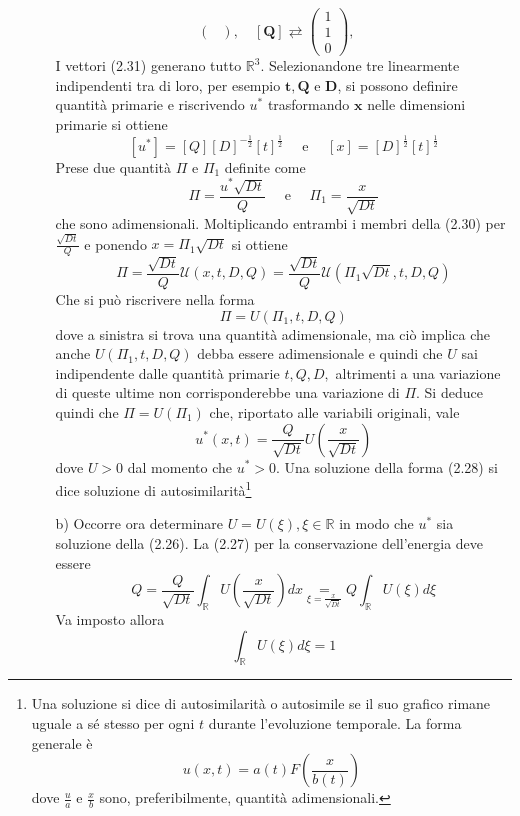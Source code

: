 \documentclass[a4paper,12pt, draft]{article}
\theoremstyle{break}
\numberwithin{equation}{section}
\begin{document}
\begin{itemize}
\begin{itemize}
\begin{equation}
\begin{pmatrix}
\end{pmatrix}, \quad
[\mathbf{Q}] \rightleftarrows \begin{pmatrix}
1\\ 1 \\ 0
\end{pmatrix}, \quad
\end{equation}
I vettori (2.31) generano tutto $\mathbb{R}^3$. Selezionandone tre linearmente indipendenti tra di loro, per esempio $\mathbf{t}, \mathbf{Q} \mbox{ e } \mathbf{D}$, si possono definire quantità primarie e riscrivendo $u^*$ trasformando $\bm{x}$ nelle dimensioni primarie si ottiene
$$
[u^*] = [Q][D]^{-\frac{1}{2}}[t]^{\frac{1}{2}} \quad \mbox{ e }\quad [x] = [D]^{\frac{1}{2}}[t]^{\frac{1}{2}} 
$$
Prese due quantità $\Pi$ e $\Pi_1$ definite come
$$
\Pi = \frac{u^*\sqrt{Dt}}{Q} \quad \mbox{ e } \quad \Pi_1 = \frac{x}{\sqrt{Dt}}
$$
che sono adimensionali. Moltiplicando entrambi i membri della (2.30) per $\frac{\sqrt{Dt}}{Q}$ e ponendo $x = \Pi_1\sqrt{Dt}$ si ottiene
$$
\Pi = \frac{\sqrt{Dt}}{Q}\mathcal{U}(x, t, D, Q) = \frac{\sqrt{Dt}}{Q}\mathcal{U}(\Pi_1\sqrt{Dt}, t, D, Q)
$$
Che si può riscrivere nella forma
\begin{equation}
\Pi = U(\Pi_1, t, D, Q)
\end{equation}
dove a sinistra si trova una quantità adimensionale, ma ciò implica che anche $U(\Pi_1, t, D, Q)$ debba essere adimensionale e quindi che $U$ sai indipendente dalle quantità primarie $t, Q, D,$ altrimenti a una variazione di queste ultime non corrisponderebbe una variazione di $\Pi$. Si deduce quindi che $\Pi = U(\Pi_1)$ che, riportato alle variabili originali, vale 
$$
u^* (x,t) = \frac{Q}{\sqrt{Dt}}U\left(\frac{x}{\sqrt{Dt}}\right)
$$
dove $U>0$ dal momento che $u^* > 0$. Una soluzione della forma (2.28) si dice soluzione di autosimilarità\footnote{Una soluzione si dice di autosimilarità o autosimile se il suo grafico rimane uguale a sé stesso per ogni $t$ durante l'evoluzione temporale. La forma generale è $$
u(x,t) = a(t)F\left(\frac{x}{b(t)}\right)
$$
dove $\frac{u}{a} \mbox{ e } \frac{x}{b}$ sono, preferibilmente, quantità adimensionali.}
\item [b)] Occorre ora determinare $U = U(\xi), \xi \in \mathbb{R}$ in modo che $u^*$ sia soluzione della (2.26). La (2.27) per la conservazione dell'energia deve essere
$$
Q = \frac{Q}{\sqrt{Dt}}\int_{\mathbb{R}}U \left(\frac{x}{\sqrt{Dt}}\right)dx \underset{\xi=\frac{x}{\sqrt{Dt}}}{=}Q\int_{\mathbb{R}}U(\xi)d\xi
$$
Va imposto allora
\begin{equation}
\int_{\mathbb{R}} U(\xi)d\xi = 1

\end{equation}
\end{itemize}
\end{itemize}
\end{document}
